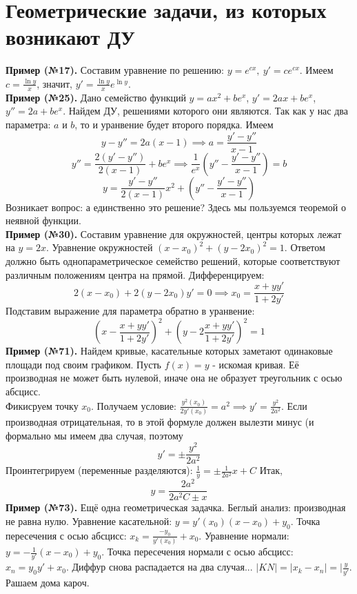 \section{Геометрические задачи, из которых возникают ДУ}
\textbf{Пример (№17).} Составим уравнение по решению: $y=e^{cx},~y'=ce^{cx}$.
Имеем $c=\frac{\ln{y}}{x}$, значит, $y'=\frac{\ln{y}}{x}e^{\ln{y}}$.\\
\textbf{Пример (№25).} Дано семейство функций $y=ax^2+be^x$, $y'=2ax+be^x$,
$y''=2a+be^x$. Найдем ДУ, решениями которого они являются. Так как у нас два 
параметра: $a$ и  $b$, то и уранвение будет второго порядка. Имеем
$$y-y''=2a(x-1)\implies a=\frac{y'-y''}{x-1}$$ 
$$y''=\frac{2(y'-y'')}{2(x-1)}+be^x\implies \frac{1}{e^x}(y''-
\frac{y'-y''}{x-1})=b$$ 
$$y=\frac{y'-y''}{2(x-1)}x^2+(y''-\frac{y'-y''}{x-1})$$
Возникает вопрос: а единственно это решение? Здесь мы пользуемся теоремой о 
неявной функции.\\
\textbf{Пример (№30).} Составим уравнение для окружностей, центры которых 
лежат на $y=2x$. Уравнение окружностей  $(x-x_0)^2+(y-2x_0)^2=1$. Ответом 
должно быть однопараметрическое семейство решений, которые соответствуют 
различным положениям центра на прямой. Дифференцируем:
$$2(x-x_0)+2(y-2x_0)y'=0\implies x_0=\frac{x+yy'}{1+2y'}$$
Подставим выражение для параметра обратно в уранвение:
$$(x-\frac{x+yy'}{1+2y'})^2+(y-2\frac{x+yy'}{1+2y'})^2=1$$
\textbf{Пример (№71).} Найдем кривые, касательные которых заметают 
одинаковые площади под своим графиком. Пусть $f(x)=y$ - искомая кривая. 
Её производная не может быть нулевой, иначе она не образует треугольник
с осью абсцисс. \\
Фикисруем точку  $x_0$.  Получаем условие: $\frac{y^2(x_0)}{2y'(x_0)}=a^2
\implies y'=\frac{y^2}{2a^2}$. Если производная отрицательная, то в этой 
формуле должен вылезти минус (и формально мы имеем два случая, поэтому 
$$y'=\pm\frac{y^2}{2a^2}$$
Проинтегрируем (переменные разделяются):
$\frac{1}{y}=\pm \frac{1}{2a^2}x+C$
Итак, $$y=\frac{2a^2}{2a^2C\pm x}$$
\textbf{Пример (№73).} Ещё одна геометрическая задачка. Беглый анализ: 
производная не равна нулю. Уравнение касательной: $y=y'(x_0)(x-x_0)+y_0$.
Точка пересечения с осью абсцисс: $x_k=\frac{-y_0}{y'(x_0)}+x_0$.
Уравнение нормали: $y=-\frac{1}{y'}(x-x_0)+y_0$. Точка пересечения нормали с
осью абсцисс: $x_n=y_0y'+x_0$. Диффур снова распадается на два случая...
$|KN|=|x_k-x_n|=|\frac{y}{y'}$. Рашаем дома кароч. 
